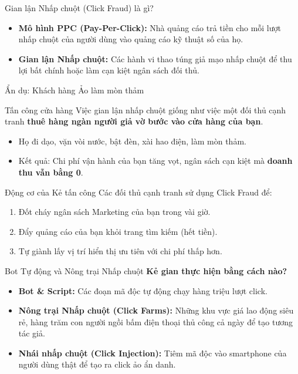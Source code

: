 \documentclass[aspectratio=169]{beamer}
\begin{document}
\begin{frame}{Gian lận Nhấp chuột (Click Fraud) là gì?}
    \begin{itemize}
        \item \textbf{Mô hình PPC (Pay-Per-Click):} Nhà quảng cáo trả tiền cho mỗi lượt nhấp chuột của người dùng vào quảng cáo kỹ thuật số của họ.
        \item \textbf{Gian lận Nhấp chuột:} Các hành vi thao túng giả mạo nhấp chuột để thu lợi bất chính hoặc làm cạn kiệt ngân sách đối thủ.
    \end{itemize}
\end{frame}

\begin{frame}{Ẩn dụ: Khách hàng Ảo làm mòn thảm}
    \begin{exampleblock}{Tấn công cửa hàng}
        Việc gian lận nhấp chuột giống như việc một đối thủ cạnh tranh \textbf{thuê hàng ngàn người giả vờ bước vào cửa hàng của bạn}.
    \end{exampleblock}
    \vspace{0.2cm}
    \begin{itemize}
        \item Họ đi dạo, vặn vòi nước, bật đèn, xài hao điện, làm mòn thảm.
        \item Kết quả: Chi phí vận hành của bạn tăng vọt, ngân sách cạn kiệt mà \textbf{doanh thu vẫn bằng 0}.
    \end{itemize}
\end{frame}

\begin{frame}{Động cơ của Kẻ tấn công}
    Các đối thủ cạnh tranh sử dụng Click Fraud để:
    \begin{enumerate}
        \item Đốt cháy ngân sách Marketing của bạn trong vài giờ.
        \item Đẩy quảng cáo của bạn khỏi trang tìm kiếm (hết tiền).
        \item Tự giành lấy vị trí hiển thị ưu tiên với chi phí thấp hơn.
    \end{enumerate}
\end{frame}

\begin{frame}{Bot Tự động và Nông trại Nhấp chuột}
    \textbf{Kẻ gian thực hiện bằng cách nào?}
    \begin{itemize}
        \item \textbf{Bot \& Script:} Các đoạn mã độc tự động chạy hàng triệu lượt click.
        \item \textbf{Nông trại Nhấp chuột (Click Farms):} Những khu vực giá lao động siêu rẻ, hàng trăm con người ngồi bấm điện thoại thủ công cả ngày để tạo tương tác giả.
        \item \textbf{Nhái nhấp chuột (Click Injection):} Tiêm mã độc vào smartphone của người dùng thật để tạo ra click ảo ẩn danh.
    \end{itemize}
\end{frame}
\end{document}

